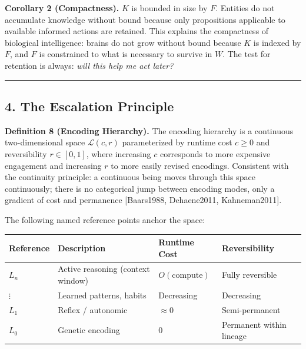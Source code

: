 \documentclass[
]{article}
\newcounter{none} %
\begin{document}
\textbf{Corollary 2 (Compactness).} \(K\) is bounded in size by \(F\).
Entities do not accumulate knowledge without bound because only
propositions applicable to available informed actions are retained. This
explains the compactness of biological intelligence: brains do not grow
without bound because \(K\) is indexed by \(F\), and \(F\) is
constrained to what is necessary to survive in \(W\). The test for
retention is always: \emph{will this help me act later?}

\begin{center}\rule{0.5\linewidth}{0.5pt}\end{center}

\subsection{4. The Escalation Principle}\label{the-escalation-principle}

\textbf{Definition 8 (Encoding Hierarchy).} The encoding hierarchy is a
continuous two-dimensional space \(\mathcal{L}(c, r)\) parameterized by
runtime cost \(c \geq 0\) and reversibility \(r \in [0, 1]\), where
increasing \(c\) corresponds to more expensive engagement and increasing
\(r\) to more easily revised encodings. Consistent with the continuity
principle: a continuous being moves through this space continuously;
there is no categorical jump between encoding modes, only a gradient of
cost and permanence {[}Baars1988, Dehaene2011, Kahneman2011{]}.

The following named reference points anchor the space:

{\def\LTcaptype{none} %
\begin{longtable}[]{@{}
  >{\raggedright\arraybackslash}p{}
  >{\raggedright\arraybackslash}p{}
  >{\raggedright\arraybackslash}p{}
  >{\raggedright\arraybackslash}p{}@{}}
\toprule\noalign{}
\begin{minipage}[b]{\linewidth}\raggedright
Reference
\end{minipage} & \begin{minipage}[b]{\linewidth}\raggedright
Description
\end{minipage} & \begin{minipage}[b]{\linewidth}\raggedright
Runtime Cost
\end{minipage} & \begin{minipage}[b]{\linewidth}\raggedright
Reversibility
\end{minipage} \\
\midrule\noalign{}
\endhead
\bottomrule\noalign{}
\endlastfoot
\(L_n\) & Active reasoning (context window) & \(O(\text{compute})\) &
Fully reversible \\
\(\vdots\) & Learned patterns, habits & Decreasing & Decreasing \\
\(L_1\) & Reflex / autonomic & \(\approx 0\) & Semi-permanent \\
\(L_0\) & Genetic encoding & \(0\) & Permanent within lineage \\
\end{longtable}
}
\end{document}
